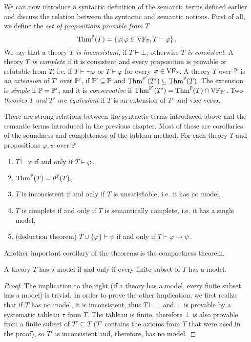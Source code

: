 We can now introduce a syntactic definition of the semantic terms defined earlier and discuss the relation between the syntactic and semantic notions. First of all, we define the \emph{set of propositions provable from $T$} $$\operatorname{Thm}^\mathbb{P}(T) = \{\varphi | \varphi \in \operatorname{VF}_\mathbb{P}, T \vdash \varphi\}\,.$$ We say that a theory \emph{$T$ is inconsistent}, if $T \vdash \bot$, otherwise \emph{$T$ is consistent}. A theory \emph{$T$ is complete} if it is consistent and every proposition is provable or refutable from $T$, i.e. if $T \vdash \neg \varphi$ or $T \vdash \varphi$ for every $\varphi \in \operatorname{VF}_\mathbb{P}$. A theory $T$ over $\mathbb{P}$ is \emph{an extension} of $T'$ over $\mathbb{P}'$, if $\mathbb{P}' \subseteq \mathbb{P}$ and $\operatorname{Thm}^{\mathbb{P}'}(T') \subseteq \operatorname{Thm}^{\mathbb{P}}(T)$. The extension is \emph{simple} if $\mathbb{P} = \mathbb{P}'$, and it is \emph{conservative} if $\operatorname{Thm}^{\mathbb{P}'}(T') = \operatorname{Thm}^{\mathbb{P}}(T) \cap \operatorname{VF}_{\mathbb{P}'}$. Two \emph{theories $T$ and $T'$ are equivalent} if $T$ is an extension of $T'$ and vice versa.

There are strong relations between the syntactic terms introduced above and the semantic terms introduced in the previous chapter. Most of these are corollaries of the soundness and completeness of the tableau method. For each theory $T$ and propositions $\varphi, \psi$ over $\mathbb{P}$ 
\begin{enumerate}
	\item $T \vdash \varphi$ if and only if $T \vDash \varphi\,,$
	\item $\operatorname{Thm}^\mathbb{P}(T) = \theta^\mathbb{P}(T)\,,$
	\item $T$ is inconsistent if and only if $T$ is unsatisfiable, i.e. it has no model,
	\item $T$ is complete if and only if $T$ is semantically complete, i.e. it has a single model,
	\item (deduction theorem) $T \cup \{\varphi\} \vdash \psi$ if and only if $T \vdash \varphi \to \psi\,.$
\end{enumerate}

Another important corollary of the theorems is the compactness theorem.

\begin{theorem}
A theory $T$ has a model if and only if every finite subset of $T$ has a model.
\end{theorem}
\begin{proof}
The implication to the right (if a theory has a model, every finite subset has a model) is trivial. In order to prove the other implication, we first realize that if $T$ has no model, it is inconsistent, thus $T \vdash \bot$ and $\bot$ is provable by a systematic tableau $\tau$ from $T$. The tableau is finite, therefore $\bot$ is also provable from a finite subset of $T' \subseteq T$ ($T'$ contains the axioms from $T$ that were used in the proof), so $T'$ is inconsistent and, therefore, has no model.
\end{proof}

